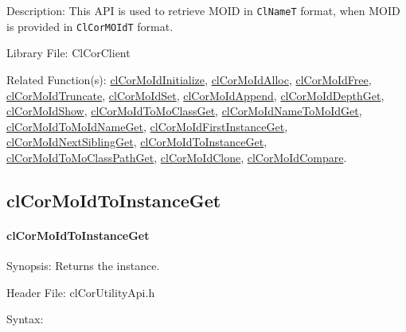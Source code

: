 \begin{flushleft}
\begin{Desc}
\item[Description:]This API is used to retrieve MOID in {\tt{ClNameT}} format, when MOID is provided in {\tt{ClCorMOIdT}} format.\end{Desc}
\begin{Desc}
\item[Library File:]Cl\-Cor\-Client\end{Desc}
\begin{Desc}
\item[Related Function(s):]\hyperlink{pagecor100}{cl\-Cor\-MoId\-Initialize}, \hyperlink{pagecor113}{cl\-Cor\-MoId\-Alloc}, 
\hyperlink{pagecor114}{cl\-Cor\-MoId\-Free},
\hyperlink{pagecor115}{cl\-Cor\-MoId\-Truncate}, 
\hyperlink{pagecor116}{cl\-Cor\-MoId\-Set}, 
\hyperlink{pagecor117}{cl\-Cor\-MoId\-Append}, 
\hyperlink{pagecor118}{cl\-Cor\-MoId\-Depth\-Get}, 
\hyperlink{pagecor119}{cl\-Cor\-MoId\-Show}, 
\hyperlink{pagecor120}{cl\-Cor\-MoId\-To\-Mo\-Class\-Get}, 
\hyperlink{pagecor121}{cl\-Cor\-MoId\-Name\-To\-MoId\-Get}, 
\hyperlink{pagecor122}{cl\-Cor\-MoId\-To\-MoId\-Name\-Get}, 
\hyperlink{pagecor123}{cl\-Cor\-MoId\-First\-Instance\-Get},
\hyperlink{pagecor124}{cl\-Cor\-MoId\-Next\-Sibling\-Get}, 
\hyperlink{pagecor125}{cl\-Cor\-MoId\-To\-Instance\-Get}, 
\hyperlink{pagecor126}{cl\-Cor\-MoId\-To\-Mo\-Class\-Path\-Get}, 
\hyperlink{pagecor127}{cl\-Cor\-MoId\-Clone}, 
\hyperlink{pagecor128}{cl\-Cor\-MoId\-Compare}.
\end{Desc}
\newpage


\subsection{clCorMoIdToInstanceGet}
\hypertarget{pagecor125}{}\paragraph{cl\-Cor\-MoId\-To\-Instance\-Get}\label{pagecor125}
\begin{Desc}
\item[Synopsis:]Returns the instance.\end{Desc}
\begin{Desc}
\item[Header File:]clCorUtilityApi.h\end{Desc}
\begin{Desc}
\item[Syntax:]


\end{Desc}
\end{flushleft}
